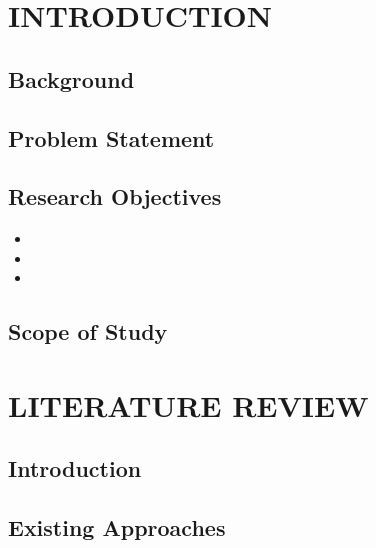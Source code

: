 \documentclass{SOICTthesis}  %
\begin{document}
\theabstract{
    \lipsum[1-2]  %
}


\chapter{INTRODUCTION}
\section{Background}
\lipsum[3-5]  %
\cite{b1, b3}

\section{Problem Statement}
\lipsum[6-7]
\cite{b2}

\section{Research Objectives}
\begin{itemize}
    \item \lipsum[8]
    \item \lipsum[9]
    \item \lipsum[10]
\end{itemize}

\section{Scope of Study}
\lipsum[11-12]

\chapter{LITERATURE REVIEW}
\section{Introduction}
\lipsum[13-15]
\cite{b5, b7}

\section{Existing Approaches}
\lipsum[16-18]
\cite{b6, b8}
\end{document}
